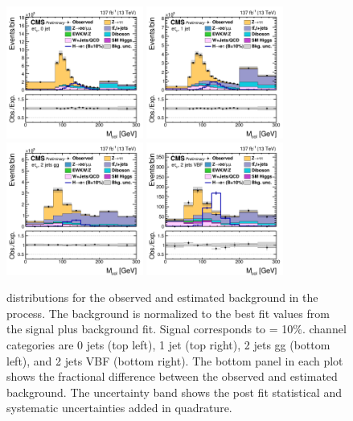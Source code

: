 \begin{figure}[htbp!]
  \centering
  \includegraphics[width=0.4\textwidth]{plots/chapter9/CB/emu/0jet.png}
  \includegraphics[width=0.4\textwidth]{plots/chapter9/CB/emu/1jet.png} \\
  \includegraphics[width=0.4\textwidth]{plots/chapter9/CB/emu/2jet_gg.png}
  \includegraphics[width=0.4\textwidth]{plots/chapter9/CB/emu/2jet_vbf.png} \\
  \caption{\mcol distributions for the observed and estimated background in the \Hemu process. The background is normalized to the best fit values from the signal plus background fit. Signal corresponds to \BHet = 10\%. \Hemu channel categories are 0 jets (top left), 1 jet (top right), 2 jets gg (bottom left), and 2 jets VBF (bottom right). The bottom panel in each plot shows the fractional difference between the observed and estimated background. The uncertainty band shows the post fit statistical and systematic uncertainties added in quadrature.}
  \label{fig:mcol_emu}
\end{figure}


